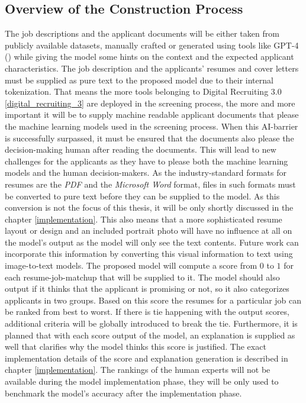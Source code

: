\documentclass[draft,final]{thesisclass} %
\begin{document}
\subsection{Overview of the Construction Process}
The job descriptions and the applicant documents will be either taken from publicly available datasets, manually crafted or generated using tools like GPT-4 (\cite{gpt4}) while giving the model some hints on the context and the expected applicant characteristics.
The job description and the applicants' resumes and cover letters must be supplied as pure text to the proposed model due to their internal tokenization.
That means the more tools belonging to Digital Recruiting 3.0 \ref{digital_recruiting_3} are deployed in the screening process, the more and more important it will be to supply machine readable applicant documents that please the machine learning models used in the screening process.
When this AI-barrier is successfully surpassed, it must be ensured that the documents also please the decision-making human after reading the documents.
This will lead to new challenges for the applicants as they have to please both the machine learning models and the human decision-makers.
As the industry-standard formats for resumes are the \textit{PDF} and the \textit{Microsoft Word} format, files in such formats must be converted to pure text before they can be supplied to the model.
As this conversion is not the focus of this thesis, it will be only shortly discussed in the chapter \ref{implementation}.
This also means that a more sophisticated resume layout or design and an included portrait photo will have no influence at all on the model's output as the model will only see the text contents.
Future work can incorporate this information by converting this visual information to text using image-to-text models.
The proposed model will compute a score from $0$ to $1$ for each resume-job-matchup that will be supplied to it.
The model should also output if it thinks that the applicant is promising or not, so it also categorizes applicants in two groups.
Based on this score the resumes for a particular job can be ranked from best to worst.
If there is tie happening with the output scores, additional criteria will be globally introduced to break the tie.
Furthermore, it is planned that with each score output of the model, an explanation is supplied as well that clarifies why the model thinks this score is justified.
The exact implementation details of the score and explanation generation is described in chapter \ref{implementation}.
The rankings of the human experts will not be available during the model implementation phase, they will be only used to benchmark the model's accuracy after the implementation phase.
\end{document}
